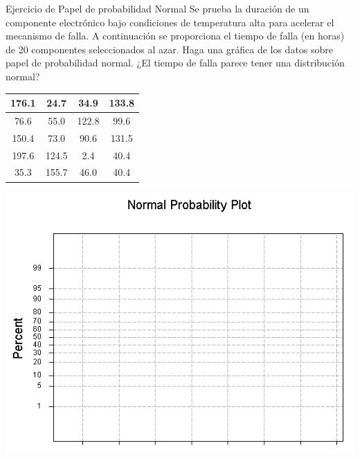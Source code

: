 \documentclass[
  10pt,
  ignorenonframetext,
]{beamer}
\begin{document}
\begin{frame}{}
\protect\hypertarget{section-45}{}
\begin{block}{Ejercicio de Papel de probabilidad Normal}
\protect\hypertarget{ejercicio-de-papel-de-probabilidad-normal}{}
Se prueba la duración de un componente electrónico bajo condiciones de
temperatura alta para acelerar el mecanismo de falla. A continuación se
proporciona el tiempo de falla (en horas) de \(20\) componentes
seleccionados al azar. Haga una gráfica de los datos sobre papel de
probabilidad normal. ¿El tiempo de falla parece tener una distribución
normal?

\begin{table}
\centering\begingroup\fontsize{9}{11}\selectfont

\begin{tabular}{c|c|c|c}
\hline
176.1 & 24.7 & 34.9 & 133.8\\
\hline
76.6 & 55.0 & 122.8 & 99.6\\
\hline
150.4 & 73.0 & 90.6 & 131.5\\
\hline
197.6 & 124.5 & 2.4 & 40.4\\
\hline
35.3 & 155.7 & 46.0 & 40.4\\
\hline
\end{tabular}
\endgroup{}
\end{table}
\end{block}
\end{frame}

\begin{frame}{}
\protect\hypertarget{section-46}{}
\includegraphics[width=2\textwidth,height=\textheight]{figuras/probpaperLandscape2.png}
\end{frame}
\end{document}
